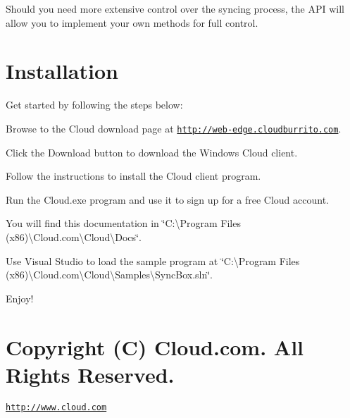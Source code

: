Should you need more extensive control over the syncing process, the A\-P\-I will allow you to implement your own methods for full control.\hypertarget{index_install_sec}{}\section{Installation}\label{index_install_sec}
Get started by following the steps below\-:
\begin{DoxyItemize}
\item Browse to the Cloud download page at \href{http://web-edge.cloudburrito.com}{\tt http\-://web-\/edge.\-cloudburrito.\-com}.
\item Click the Download button to download the Windows Cloud client.
\item Follow the instructions to install the Cloud client program.
\item Run the Cloud.\-exe program and use it to sign up for a free Cloud account.
\item You will find this documentation in \char`\"{}\-C\-:\textbackslash{}\-Program Files (x86)\textbackslash{}\-Cloud.\-com\textbackslash{}\-Cloud\textbackslash{}\-Docs\char`\"{}.
\item Use Visual Studio to load the sample program at \char`\"{}\-C\-:\textbackslash{}\-Program Files (x86)\textbackslash{}\-Cloud.\-com\textbackslash{}\-Cloud\textbackslash{}\-Samples\textbackslash{}\-Sync\-Box.\-sln\char`\"{}.
\item Enjoy!
\end{DoxyItemize}\hypertarget{index_copyright_sec}{}\section{Copyright (\-C) Cloud.\-com.  All Rights Reserved.}\label{index_copyright_sec}
\href{http://www.cloud.com}{\tt http\-://www.\-cloud.\-com} 